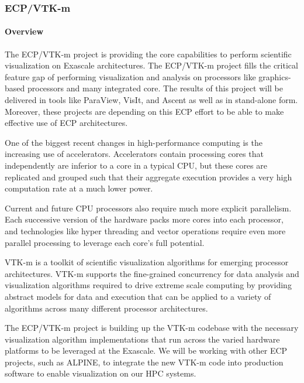 
\subsubsection{ ECP/VTK-m}

\paragraph{Overview}
The ECP/VTK-m project is providing the core capabilities to perform scientific visualization on Exascale architectures.
The ECP/VTK-m project fills the critical feature gap of performing visualization and analysis on processors like graphics-based processors and many integrated core.
The results of this project will be delivered in tools like ParaView, VisIt, and Ascent as well as in stand-alone form.
Moreover, these projects are depending on this ECP effort to be able to make effective use of ECP architectures.

One of the biggest recent changes in high-performance computing is the increasing use of accelerators.
Accelerators contain processing cores that independently are inferior to a core in a typical CPU, but these cores are replicated and grouped such that their aggregate execution provides a very high computation rate at a much lower power.

Current and future CPU processors also require much more explicit parallelism.
Each successive version of the hardware packs more cores into each processor, and technologies like hyper threading and vector operations require even more parallel processing to leverage each core's full potential.

VTK-m is a toolkit of scientific visualization algorithms for emerging processor architectures.
VTK-m supports the fine-grained concurrency for data analysis and visualization algorithms required to drive extreme scale computing by providing abstract models for data and execution that can be applied to a variety of algorithms across many different processor architectures.

The ECP/VTK-m project is building up the VTK-m codebase with the necessary visualization algorithm implementations that run across the varied hardware platforms to be leveraged at the Exascale.
We will be working with other ECP projects, such as ALPINE, to integrate the new VTK-m code into production software to enable visualization on our HPC systems.

